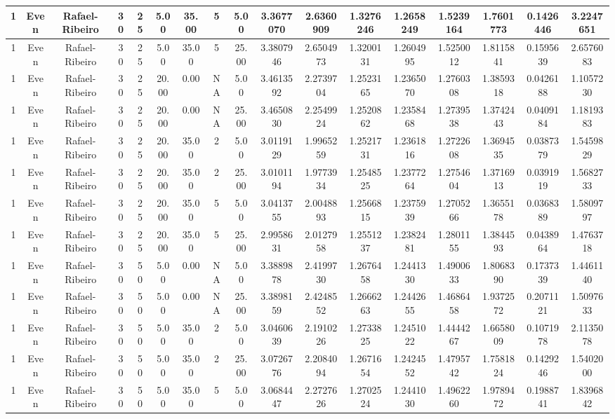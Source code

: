 \begin{longtable}{ | c | c | c | c | c | c | c | c | c | c | c | c | c | c | c | c | c | }
	\hline
	1	&	Even	&	Rafael-Ribeiro	&	30	&	25	&	5.00	&	35.00	&	5	&	5.00	&	3.3677070	&	2.6360909	&	1.3276246	&	1.2658249	&	1.5239164	&	1.7601773	&	0.1426446	&	3.2247651 \\
	\hline
	1	&	Even	&	Rafael-Ribeiro	&	30	&	25	&	5.00	&	35.00	&	5	&	25.00	&	3.3807946	&	2.6504973	&	1.3200131	&	1.2604995	&	1.5250012	&	1.8115841	&	0.1595639	&	2.6576083 \\
	\hline
	1	&	Even	&	Rafael-Ribeiro	&	30	&	25	&	20.00	&	0.00	&	NA	&	5.00	&	3.4613592	&	2.2739704	&	1.2523165	&	1.2365070	&	1.2760308	&	1.3859318	&	0.0426188	&	1.1057230 \\
	\hline
	1	&	Even	&	Rafael-Ribeiro	&	30	&	25	&	20.00	&	0.00	&	NA	&	25.00	&	3.4650830	&	2.2549924	&	1.2520862	&	1.2358468	&	1.2739538	&	1.3742443	&	0.0409184	&	1.1819383 \\
	\hline
	1	&	Even	&	Rafael-Ribeiro	&	30	&	25	&	20.00	&	35.00	&	2	&	5.00	&	3.0119129	&	1.9965259	&	1.2521731	&	1.2361816	&	1.2722608	&	1.3694535	&	0.0387379	&	1.5459829 \\
	\hline
	1	&	Even	&	Rafael-Ribeiro	&	30	&	25	&	20.00	&	35.00	&	2	&	25.00	&	3.0101194	&	1.9773934	&	1.2548525	&	1.2377264	&	1.2754604	&	1.3716913	&	0.0391919	&	1.5682733 \\
	\hline
	1	&	Even	&	Rafael-Ribeiro	&	30	&	25	&	20.00	&	35.00	&	5	&	5.00	&	3.0413755	&	2.0048893	&	1.2566815	&	1.2375939	&	1.2705266	&	1.3655178	&	0.0368389	&	1.5809797 \\
	\hline
	1	&	Even	&	Rafael-Ribeiro	&	30	&	25	&	20.00	&	35.00	&	5	&	25.00	&	2.9958631	&	2.0127958	&	1.2551237	&	1.2382481	&	1.2801155	&	1.3844593	&	0.0438964	&	1.4763718 \\
	\hline
	1	&	Even	&	Rafael-Ribeiro	&	30	&	50	&	5.00	&	0.00	&	NA	&	5.00	&	3.3889878	&	2.4199730	&	1.2676458	&	1.2441330	&	1.4900633	&	1.8068390	&	0.1737339	&	1.4461140 \\
	\hline
	1	&	Even	&	Rafael-Ribeiro	&	30	&	50	&	5.00	&	0.00	&	NA	&	25.00	&	3.3898159	&	2.4248552	&	1.2666263	&	1.2442655	&	1.4686458	&	1.9372572	&	0.2071121	&	1.5097633 \\
	\hline
	1	&	Even	&	Rafael-Ribeiro	&	30	&	50	&	5.00	&	35.00	&	2	&	5.00	&	3.0460639	&	2.1910226	&	1.2733825	&	1.2451022	&	1.4444267	&	1.6658009	&	0.1071978	&	2.1135078 \\
	\hline
	1	&	Even	&	Rafael-Ribeiro	&	30	&	50	&	5.00	&	35.00	&	2	&	25.00	&	3.0726776	&	2.2084094	&	1.2671654	&	1.2424552	&	1.4795742	&	1.7581824	&	0.1429246	&	1.5402000 \\
	\hline
	1	&	Even	&	Rafael-Ribeiro	&	30	&	50	&	5.00	&	35.00	&	5	&	5.00	&	3.0684447	&	2.2727626	&	1.2702524	&	1.2441030	&	1.4962260	&	1.9789472	&	0.1988741	&	1.8396842 \\

\end{longtable}
